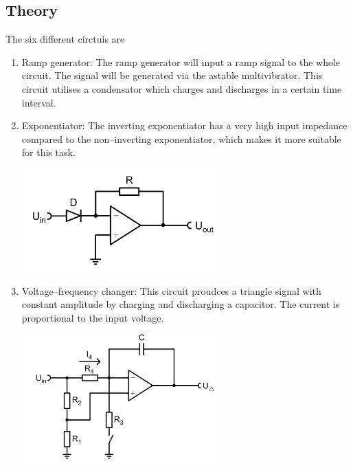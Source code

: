 \documentclass[a4paper,10pt]{article}
\newenvironment{Figure}
        {\par\medskip\noindent\minipage{\linewidth}}
        {\endminipage\par\medskip} %
\numberwithin{equation}{section}
\begin{document}
\begin{multicols}{2}
        \section{Theory}
        The six different circtuis are
        \begin{enumerate}[label=\arabic*]
                \item Ramp generator: 
                        The ramp generator will input a ramp signal to the whole circuit.
                        The signal will be generated via the astable multivibrator.
                        This circuit utilises a condensator which charges and discharges in a certain time interval.
                \item Exponentiator: 
                        The inverting exponentiator has a very high input impedance compared to the non--inverting exponentiator, which makes it more suitable for this task. 
                        \begin{Figure}
                                \centering
                                \includegraphics[width=0.6\textwidth]{inverting_exp.png}
                        \end{Figure}
                \item Voltage--frequency changer: 
                        This circuit proudces a triangle signal with constant amplitude by charging and discharging a capacitor.
                        The current is proportional to the input voltage.
                        \begin{Figure}
                                \centering
                                \includegraphics[width=0.6\textwidth]{reversible_integrator.png}

\end{Figure}
\end{enumerate}
\end{multicols}
\end{document}
